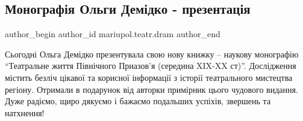  
 
 
 
 

\subsection{Монографія Ольги Демідко - презентація}
\label{sec:07_10_2021.fb.mariupol.teatr.dram.1.monografia_olga_demidko_prezentacia}

\ifcmt
 author_begin
   author_id mariupol.teatr.dram
 author_end
\fi

Сьогодні Ольга Демідко презентувала свою нову книжку – наукову монографію
\enquote{Театральне життя Північного Приазов'я (середина XIX-XX ст)}. Дослідження
містить безліч цікавої та корисної інформації з історії театрального мистецтва
регіону. Отримали в подарунок від авторки примірник цього чудового видання.🤗
Дуже радіємо, щиро дякуємо і бажаємо подальших успіхів, звершень та натхнення!
